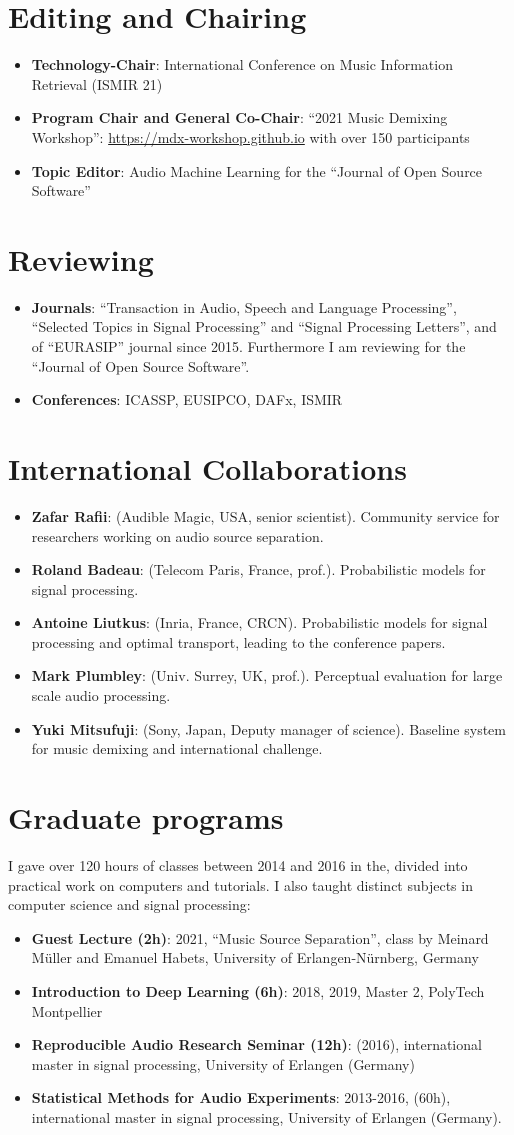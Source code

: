 \documentclass[a4paper,11pt]{article}
\newcommand{\resumeItem}[2]{
  \item\small{
    \textbf{#1}{: #2 \vspace{-2pt}}
  }
}
\newcommand{\resumeSubItem}[2]{\resumeItem{#1}{#2}\vspace{-4pt}}
\newcommand{\resumeSubHeadingListStart}{\begin{itemize}[leftmargin=*]}
\newcommand{\resumeSubHeadingListEnd}{\end{itemize}}
\begin{document}
\section{Editing and Chairing}
\resumeSubHeadingListStart  
  \resumeSubItem{Technology-Chair}{International Conference on Music Information Retrieval (ISMIR 21)}
  \resumeSubItem{Program Chair and General Co-Chair}{``2021 Music Demixing Workshop'': \url{https://mdx-workshop.github.io} with over 150 participants}
  \resumeSubItem{Topic Editor}{Audio Machine Learning for the  ``Journal of Open Source Software''}
\resumeSubHeadingListEnd

\section{Reviewing}
\resumeSubHeadingListStart
  \resumeSubItem{Journals}{``Transaction in Audio, Speech and Language Processing'', ``Selected Topics in Signal Processing'' and ``Signal Processing Letters'', and of ``EURASIP'' journal since 2015. Furthermore I am reviewing for the ``Journal of Open Source Software''.}
  \resumeSubItem{Conferences}{ICASSP, EUSIPCO, DAFx, ISMIR}
\resumeSubHeadingListEnd

\section{International Collaborations}
\resumeSubHeadingListStart
  \resumeSubItem{Zafar Rafii}{(Audible Magic, USA, senior scientist). Community service for researchers working on audio source separation.}
  \resumeSubItem{Roland Badeau}{(Telecom Paris, France, prof.). Probabilistic models for signal processing.}
  \resumeSubItem{Antoine Liutkus}{(Inria, France, CRCN). Probabilistic models for signal processing and optimal transport, leading to the conference papers.}
  \resumeSubItem{Mark Plumbley}{(Univ. Surrey, UK, prof.). Perceptual evaluation for large scale audio processing.}
  \resumeSubItem{Yuki Mitsufuji}{(Sony, Japan, Deputy manager of science). Baseline system for music demixing and international challenge.}
\resumeSubHeadingListEnd

\section{Graduate programs}
 I gave over 120 hours of classes between 2014 and 2016 in the, divided into practical work on computers and tutorials. I also taught distinct subjects in computer science and signal processing:
\resumeSubHeadingListStart
 \resumeSubItem{Guest Lecture (2h)}{2021, ``Music Source Separation'', class by Meinard Müller and Emanuel Habets, University of Erlangen-Nürnberg, Germany}
 \resumeSubItem{Introduction to Deep Learning (6h)}{2018, 2019, Master 2, PolyTech Montpellier}
 \resumeSubItem{Reproducible Audio Research Seminar (12h)}{(2016), international master in signal processing, University of Erlangen (Germany)}
 \resumeSubItem{Statistical Methods for Audio Experiments}{2013-2016, (60h), international master in signal processing, University of Erlangen (Germany).}
\resumeSubHeadingListEnd
\end{document}
